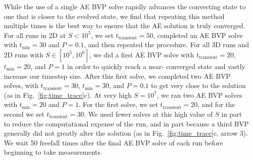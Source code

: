 \documentclass[aps, pre, onecolumn, nofootinbib, notitlepage, groupedaddress, amsfonts, amssymb, amsmath, longbibliography]{revtex4-1}
\begin{document}
While the use of a single AE BVP solve rapidly advances the convecting state to
one that is closer to the evolved state, we find that repeating this method 
multiple times is the best way to
ensure that the AE solution is truly converged. For all runs in 2D at $S < 10^5$, we
set $t_{\text{transient}} = 50$, completed an AE BVP solve
with $t_{\text{min}} = 30$ and $P = 0.1$, and then repeated the procedure.
For all 3D runs and 2D runs with $S \in [10^5, 10^6]$,
we did a first AE BVP solve with $t_{\text{transient}} = 20$,
$t_{\text{min}} = 20$, and $P = 1$ in order to quickly reach a near-
converged state and vastly increase our timestep size.  After this first solve, 
we completed two AE BVP solves, with $t_{\text{transient}} = 30$,
$t_{\text{min}} = 30$, 
and $P = 0.1$ to get very close to the solution (as in Fig.~\ref{fig:time_trace}c).
At very high $S = 10^7$, we ran two AE BVP solves with $t_{\text{min}} = 20$ and
$P = 1$. For the first solve, we set $t_{\text{transient}} = 20$, and for the
second we set $t_{\text{transient}} = 30$. We used fewer solves at this high
value of $S$ in part to reduce the computational expense of the run, and in
part because a third BVP generally did not greatly alter the solution
(as in Fig.~\ref{fig:time_trace}c, arrow 3). We wait 50 freefall times after
the final AE BVP solve of each run before beginning to take measurements.







\end{document}
